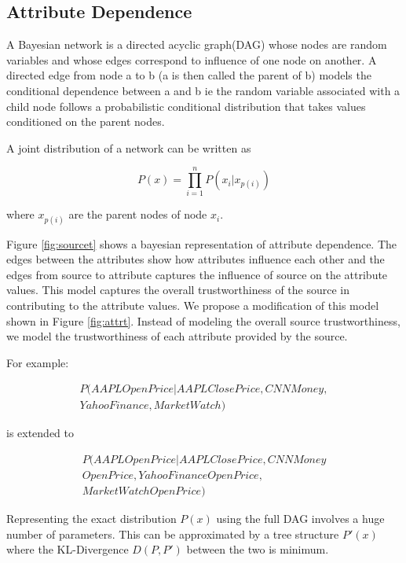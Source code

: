 \documentclass{acm_proc_article-sp}
\begin{document}
\subsection{Attribute Dependence}

A Bayesian network is a directed acyclic graph(DAG) whose nodes are random variables and whose edges correspond to influence of one node on another. A directed edge from node a to b (a is then called the parent of b) models the conditional dependence between a and b ie the random variable associated with a child node follows a probabilistic conditional distribution that takes values conditioned on the parent nodes.

A joint distribution of a network can be written as 

\begin{equation}
P(x) = \prod_{i=1}^n P(x_i|x_{p(i)})
\end{equation}

where $x_{p(i)}$ are the parent nodes of node $x_i$.

Figure \ref{fig:sourcet} shows a bayesian representation of attribute dependence. The edges between the attributes show how attributes influence each other and the edges from source to attribute captures the influence of source on the attribute values. This model captures the overall trustworthiness of the source in contributing to the attribute values.  We propose a modification of this model shown in Figure \ref{fig:attrt}. Instead of modeling the overall source trustworthiness, we model the trustworthiness of each attribute provided by the source. 

For example:


\begin{align}
P(AAPL Open Price|AAPL Close Price, CNN Money,\nonumber  
\\Yahoo Finance, Market Watch) 
\end{align}

is extended to 

\begin{align}
P(AAPL Open Price|AAPL Close Price, CNN Money \nonumber  
\\Open Price,Yahoo Finance Open Price, \nonumber  
\\Market Watch Open Price) 
\end{align}

Representing the exact distribution $P(x)$ using the full DAG involves a huge number of parameters. This can be approximated by a tree structure $P'(x)$ where the KL-Divergence $D(P,P')$ between the two is minimum.  
\end{document}
